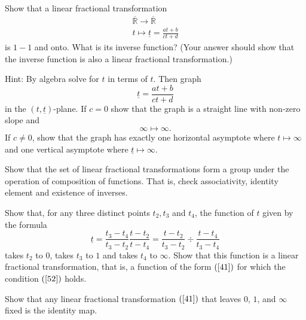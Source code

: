 \begin{exercise}
Show that a linear fractional transformation%
\begin{gather*}
\overline{\mathbb{R}}\rightarrow\overline{\mathbb{R}}\\
t\mapsto\underline{t}=\frac{at+b}{ct+d}%
\end{gather*}
is $1-1$ and onto. What is its inverse function? (Your answer should show that
the inverse function is also a linear fractional transformation.)

Hint: By algebra solve for $t$ in terms of \underline{$t$}. Then graph%
\[
\underline{t}=\frac{at+b}{ct+d}%
\]
in the $\left(  t,\underline{t}\right)  $-plane. If $c=0$ show that the graph
is a straight line with non-zero slope and%
\[
\infty\mapsto\infty.
\]
If $c\neq0$, show that the graph has exactly one horizontal asymptote where
$t\mapsto\infty$ and one vertical asymptote where $\underline{t}\mapsto\infty$.
\end{exercise}

\begin{exercise}
Show that the set of linear fractional transformations form a group under the
operation of composition of functions. That is, check associativity, identity
element and existence of inverses.
\end{exercise}

\begin{exercise}
\label{59}Show that, for any three distinct points $t_{2},t_{3}$ and $t_{4}$,
the function of $t$ given by the formula%
\[
\underline{t}=\frac{t_{3}-t_{4}}{t_{3}-t_{2}}\frac{t-t_{2}}{t-t_{4}}%
=\frac{t-t_{2}}{t_{3}-t_{2}}\div\frac{t-t_{4}}{t_{3}-t_{4}}%
\]
takes $t_{2}$ to $0$, takes $t_{3}$ to $1$ and takes $t_{4}$ to $\infty$. Show
that this function is a linear fractional transformation, that is, a function
of the form $\left(  \ref{41}\right)  $ for which the condition $\left(
\ref{52}\right)  $ holds.
\end{exercise}

\begin{exercise}
\label{57}Show that any linear fractional transformation $\left(
\ref{41}\right)  $ that leaves $0$, $1$, and $\infty$ fixed is the identity map.
\end{exercise}

